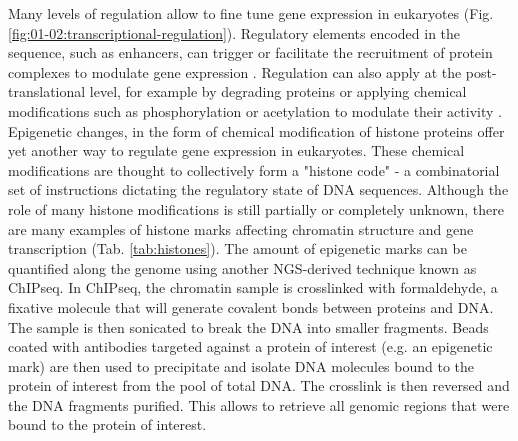 Many levels of regulation allow to fine tune gene expression in eukaryotes (Fig. \ref{fig:01-02:transcriptional-regulation}). Regulatory elements encoded in the sequence, such as enhancers, can trigger or facilitate the recruitment of protein complexes to modulate gene expression \cite{levoPursuitDesignPrinciples2014}. Regulation can also apply at the post-translational level, for example by degrading proteins \cite{brownSREBPPathwayRegulation1997} or applying chemical modifications such as phosphorylation or acetylation to modulate their activity \cite{christensenPosttranslationalProteinAcetylation2019}. Epigenetic changes, in the form of chemical modification of histone proteins offer yet another way to regulate gene expression in eukaryotes. These chemical modifications are thought to collectively form a "histone code" \cite{strahlLanguageCovalentHistone2000} - a combinatorial set of instructions dictating the regulatory state of DNA sequences. Although the role of many histone modifications is still partially or completely unknown, there are many examples of histone marks affecting chromatin structure \cite{huangPredictingChromatinOrganization2015,wangHistoneModificationsRegulate2019} and gene transcription (Tab. \ref{tab:histones}). The amount of epigenetic marks can be quantified along the genome using another NGS-derived technique known as \acrfull{ChIPseq}. In \acrshort{ChIPseq}, the chromatin sample is crosslinked with formaldehyde, a fixative molecule that will generate covalent bonds between proteins and DNA. The sample is then sonicated to break the DNA into smaller fragments. Beads coated with antibodies targeted against a protein of interest (e.g. an epigenetic mark) are then used to precipitate and isolate DNA molecules bound to the protein of interest from the pool of total DNA. The crosslink is then reversed and the DNA fragments purified. This allows to retrieve all genomic regions that were bound to the protein of interest. 

